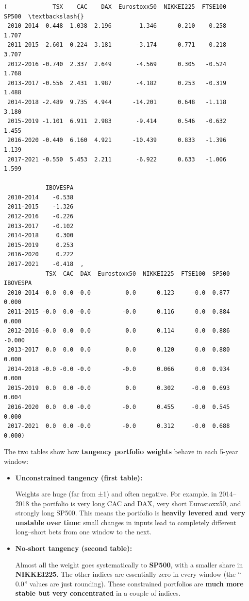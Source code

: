 \documentclass[11pt]{article}
\begin{document}
            \begin{tcolorbox}[breakable, size=fbox, boxrule=.5pt, pad at break*=1mm, opacityfill=0]
\begin{Verbatim}[commandchars=\\\{\}]
(             TSX    CAC    DAX  Eurostoxx50  NIKKEI225  FTSE100  SP500  \textbackslash{}
 2010-2014 -0.448 -1.038  2.196       -1.346      0.210    0.258  1.707
 2011-2015 -2.601  0.224  3.181       -3.174      0.771    0.218  3.707
 2012-2016 -0.740  2.337  2.649       -4.569      0.305   -0.524  1.768
 2013-2017 -0.556  2.431  1.987       -4.182      0.253   -0.319  1.488
 2014-2018 -2.489  9.735  4.944      -14.201      0.648   -1.118  3.180
 2015-2019 -1.101  6.911  2.983       -9.414      0.546   -0.632  1.455
 2016-2020 -0.440  6.160  4.921      -10.439      0.833   -1.396  1.139
 2017-2021 -0.550  5.453  2.211       -6.922      0.633   -1.006  1.599

            IBOVESPA
 2010-2014    -0.538
 2011-2015    -1.326
 2012-2016    -0.226
 2013-2017    -0.102
 2014-2018     0.300
 2015-2019     0.253
 2016-2020     0.222
 2017-2021    -0.418  ,
            TSX  CAC  DAX  Eurostoxx50  NIKKEI225  FTSE100  SP500  IBOVESPA
 2010-2014 -0.0  0.0 -0.0          0.0      0.123     -0.0  0.877     0.000
 2011-2015 -0.0  0.0 -0.0         -0.0      0.116      0.0  0.884     0.000
 2012-2016 -0.0  0.0  0.0          0.0      0.114      0.0  0.886    -0.000
 2013-2017  0.0  0.0  0.0          0.0      0.120      0.0  0.880     0.000
 2014-2018 -0.0 -0.0 -0.0         -0.0      0.066      0.0  0.934     0.000
 2015-2019  0.0  0.0 -0.0          0.0      0.302     -0.0  0.693     0.004
 2016-2020  0.0  0.0 -0.0         -0.0      0.455     -0.0  0.545     0.000
 2017-2021  0.0  0.0 -0.0         -0.0      0.312     -0.0  0.688     0.000)
\end{Verbatim}
\end{tcolorbox}
        
    The two tables show how \textbf{tangency portfolio weights} behave in
each 5-year window:

\begin{itemize}
\item
  \textbf{Unconstrained tangency (first table):}

  Weights are huge (far from ±1) and often negative. For example, in
  2014--2018 the portfolio is very long CAC and DAX, very short
  Eurostoxx50, and strongly long SP500. This means the portfolio is
  \textbf{heavily levered and very unstable over time}: small changes in
  inputs lead to completely different long--short bets from one window
  to the next.
\item
  \textbf{No-short tangency (second table):}

  Almost all the weight goes systematically to \textbf{SP500}, with a
  smaller share in \textbf{NIKKEI225}. The other indices are essentially
  zero in every window (the ``--0.0'' values are just rounding). These
  constrained portfolios are \textbf{much more stable but very
  concentrated} in a couple of indices.
\end{itemize}
\end{document}
